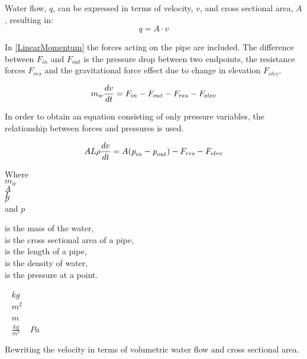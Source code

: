 Water flow, $q$, can be expressed in terms of velocity, $v$, and cross sectional 
area, $A$, resulting in:\\
\begin{equation}
  q=A \cdot v
	\label{EquationOfContinuity}
\end{equation}

 In \eqref{LinearMomentum} the forces acting on the pipe are included. The difference between $F_{in}$ and $F_{out}$ is the pressure drop between two endpoints, the resistance forces $F_{res}$ and the gravitational force effect due to change in elevation $F_{elev}$.

\begin{equation}
  m_w \frac{dv}{dt} = F_{in} - F_{out} - F_{res} - F_{elev} \\
  \label{LinearMomentum}
\end{equation}

In order to obtain an equation consisting of only pressure variables, the relationship between forces and pressures is used.


 \begin{equation}
    A L \rho \frac{dv}{dt} = A (\textit{p}_{in} - \textit{p}_{out}) - F_{res} - F_{elev} \\
\end{equation}

\begin{minipage}[t]{0.20\textwidth}
Where\\
\hspace*{8mm} $m_w$ \\
\hspace*{8mm} $A$ \\
\hspace*{8mm} $L$ \\
\hspace*{8mm} $\rho$\\
and \hspace*{0.7mm} $p$ 
\end{minipage}
\begin{minipage}[t]{0.68\textwidth}
\vspace*{2mm}
is the mass of the water,\\
is the cross sectional area of a pipe,\\
is the length of a pipe,\\
is the density of water,\\
is the pressure at a point.
\end{minipage}
\begin{minipage}[t]{0.10\textwidth}
\vspace*{2mm}
\textcolor{White}{te}$\unit{kg}$\\
\textcolor{White}{te}$\unit{m^2}$\\
\textcolor{White}{te}$\unit{m}$\\
\textcolor{White}{te}$\unit{\frac{kg}{m^{3}}}$
\textcolor{White}{te}$\unit{Pa}$\\
\end{minipage}
%
Rewriting the velocity in terms of volumetric water flow and cross sectional 
area. 

